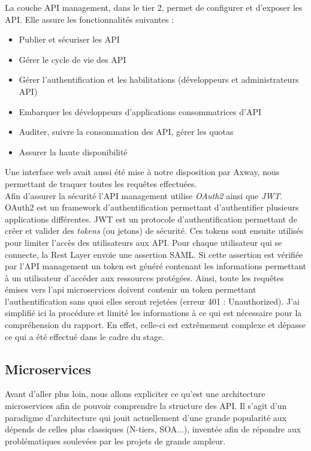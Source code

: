 	La couche API management, dans le tier 2, permet de configurer et d’exposer les API. Elle assure les fonctionnalités suivantes : \\
	
	\begin{itemize}
		\item Publier et sécuriser les API
		\item Gérer le cycle de vie des API
		\item Gérer l’authentification et les habilitations (développeurs et administrateurs API)
		\item Embarquer les développeurs d’applications consommatrices d’API
		\item Auditer, suivre la consommation des API, gérer les quotas
		\item Assurer la haute disponibilité \\
	\end{itemize}
	
	Une interface web avait aussi été mise à notre disposition par Axway, nous permettant de traquer toutes les requêtes effectuées. \\
	
	Afin d'assurer la sécurité l'API management utilise \textit{OAuth2} ainsi que \textit{JWT}. OAuth2 est un framework d'authentification permettant d'authentifier plusieurs applications différentes. JWT est un protocole d'authentification permettant de créer et valider des \textit{tokens} (ou jetons) de sécurité. Ces tokens sont ensuite utilisés pour limiter l'accès des utilisateurs aux API. Pour chaque utilisateur qui se connecte, la Rest Layer envoie une assertion SAML. Si cette assertion est vérifiée par l'API management un token est généré contenant les informations permettant à un utilisateur d'accéder aux ressources protégées. Ainsi, toute les requêtes émises vers l'api microservices doivent contenir un token permettant l'authentification sans quoi elles seront rejetées (erreur 401 : Unauthorized). J'ai simplifié ici la procédure et limité les informations à ce qui est nécessaire pour la compréhension du rapport. En effet, celle-ci est extrêmement complexe et dépasse ce qui a été effectué dans le cadre du stage.
	
\subsection{Microservices}
\label{microservicesArchi}

	Avant d'aller plus loin, nous allons expliciter ce qu'est une architecture microservices \cite{bib_microservices} afin de pouvoir comprendre la structure des API. Il s'agit d'un paradigme d'architecture qui jouit actuellement d'une grande popularité aux dépends de celles plus classiques (N-tiers, SOA...), inventée afin de répondre aux problématiques soulevées par les projets de grande ampleur. \\
	
